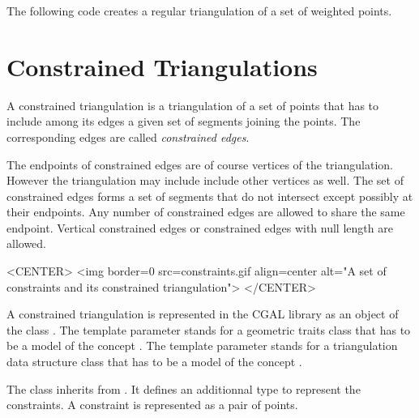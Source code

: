 The following code  creates a regular triangulation 
of a set of weighted points.



\section{Constrained Triangulations}
\label{Section_2D_Triangulations_Constrained}

\label{Subsection_2D_Triangulations_Constrained_Description}
A constrained triangulation is a triangulation of a set of points
that has to include among its edges 
a given set of segments joining the points. The corresponding 
edges are called {\em constrained edges}. 

The endpoints of constrained edges are of course vertices of the
triangulation. However the triangulation may include
include other vertices as well.  The set of
constrained edges forms a set of segments that do not intersect
except possibly at their endpoints.  Any number of constrained edges
are allowed to share the same endpoint.  Vertical constrained edges or
constrained edges with null length are allowed.

\begin{ccTexOnly}
\begin{center}   \end{center}
\end{ccTexOnly}
 
\begin{ccHtmlOnly}
<CENTER>
<img border=0 src=constraints.gif align=center alt="A set of
constraints and its constrained triangulation">
</CENTER>
\end{ccHtmlOnly}

A constrained triangulation is represented in the CGAL library as an
object of the class .
The template parameter  
stands for a geometric traits class  that has to be a model
of the concept .
The template parameter 
stands for 
a triangulation data structure class that has to be a model
of the concept .

The class 
inherits from .
It defines an additionnal type 
to represent the constraints. A
constraint is represented as a pair of points.

